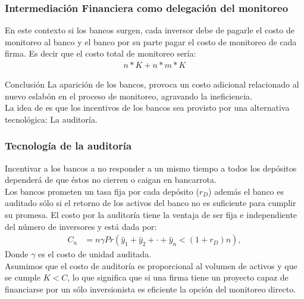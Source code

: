 \documentclass[10pt, xcolor=table, x11names]{beamer}
\begin{document}
\begin{frame}
    \frametitle{{\normalsize Intermediación Financiera como delegación del monitoreo} {}}
   
    En este contexto si los bancos surgen, cada inversor debe de pagarle el costo de monitoreo al banco y el banco por su parte pagar el costo de monitoreo de cada firma. Es decir que el costo total de monitoreo sería:
    \begin{align}
    n*K+n*m*K
    \end{align}
     \begin{block} {Conclusión}
     La aparición de los bancos, provoca un costo adicional relacionado al nuevo eslabón en el proceso de monitoreo, agravando la ineficiencia. \\
     La idea de \cite{Diamond1984} es que los incentivos de los bancos sea provisto por una alternativa tecnológica: La auditoría.   
    \end{block}
    
    
   
\end{frame}

\begin{frame}
    \frametitle{{\normalsize Tecnología de la auditoría} {}}
    
    Incentivar a los bancos a no responder a un mismo tiempo a todos los depósitos dependerá de que éstos no cierren o caigan en bancarrota. \\
    Los bancos prometen un tasa fija por cada depósito ($r_{D}$)  además el banco es auditado sólo si el retorno de los activos del banco no es suficiente para cumplir su promesa.
    El costo por la auditoría tiene la ventaja de ser fija e independiente del número de inversores y está dada por:
    \begin{align}
    C_{n}&=n\gamma Pr(\hat{y}_{1}+\hat{y}_{2}+\cdot+\hat{y}_{n}<(1+r_{D})n),
    \end{align}
    Donde $\gamma$ es el costo de unidad auditada.\\
    
     Asumimos que el costo de auditoría es proporcional al volumen de activos y que se cumple $K<C$, lo que significa que si una firma tiene un proyecto capaz de financiarse por un sólo inversionista  es eficiente la opción del monitoreo directo. 
    
\end{frame}
\end{document}
